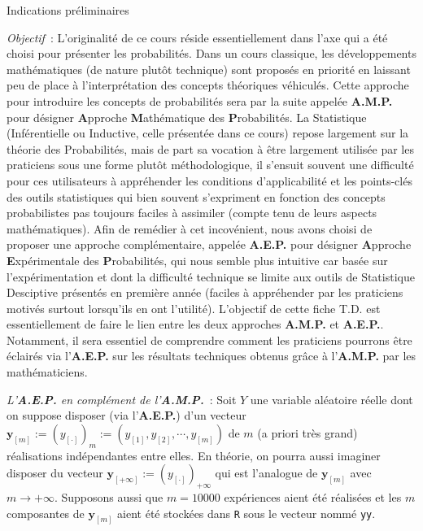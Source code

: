 \documentclass[10pt]{report}
\begin{document}
\begin{IndicList}{Indications préliminaires} 
\item \textit{Objectif}~: L'originalité de ce cours réside essentiellement dans l'axe qui a été choisi pour présenter les probabilités. Dans un cours classique, les développements mathématiques (de nature plutôt technique) sont proposés en priorité en laissant peu de place à l'interprétation des concepts théoriques véhiculés. Cette approche pour introduire les concepts de probabilités sera par la suite appelée \textbf{A.M.P.} pour désigner \textbf{A}pproche \textbf{M}athématique des \textbf{P}robabilités. La Statistique (Inférentielle ou Inductive, celle présentée dans ce cours) repose largement sur la théorie des Probabilités, mais de part sa vocation à être largement utilisée  par les praticiens sous une forme plutôt méthodologique, il s'ensuit souvent une difficulté pour ces utilisateurs à appréhender les conditions d'applicabilité et les points-clés des outils statistiques qui bien souvent s'expriment en fonction des concepts probabilistes pas toujours faciles à assimiler (compte tenu de leurs aspects mathématiques). Afin de remédier à cet incovénient, nous avons choisi de proposer une approche complémentaire, appelée  \textbf{A.E.P.} pour désigner \textbf{A}pproche \textbf{E}xpérimentale des \textbf{P}robabilités, qui nous semble plus intuitive car basée sur l'expérimentation et dont la difficulté technique se limite aux outils de Statistique Desciptive présentés en première année (faciles à appréhender par les praticiens motivés surtout lorsqu'ils en ont l'utilité). L'objectif de cette fiche T.D. est essentiellement de faire le lien entre les deux approches \textbf{A.M.P.} et \textbf{A.E.P.}. Notamment, il sera essentiel de comprendre comment les praticiens pourrons être éclairés via  l'\textbf{A.E.P.}  sur les résultats techniques obtenus grâce à l'\textbf{A.M.P.} par les mathématiciens. 
\item \textit{L'\textbf{A.E.P.} en complément de l'\textbf{A.M.P.}}~: Soit $Y$ une variable aléatoire réelle dont on suppose disposer (via l'\textbf{A.E.P.}) d'un vecteur $\textbf{y}_{[m]}:=(y_{[\cdot]})_m:=(y_{[1]},y_{[2]},\cdots,y_{[m]})$ de $m$ (a priori très grand) réalisations indépendantes entre elles. En théorie, on pourra aussi imaginer disposer du vecteur $\textbf{y}_{[+\infty]}:=(y_{[\cdot]})_{+\infty}$ qui est l'analogue de $\textbf{y}_{[m]}$ avec $m\rightarrow +\infty$. Supposons  aussi que $m=10000$ expériences aient été réalisées et les $m$ composantes de $\textbf{y}_{[m]}$ aient été stockées dans \texttt{R} sous le vecteur nommé \texttt{yy}.


\end{IndicList}
\end{document}
